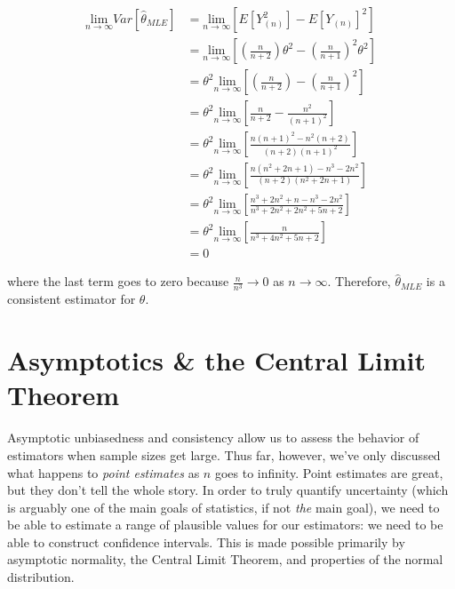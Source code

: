 \documentclass[
  letterpaper,
  DIV=11,
  numbers=noendperiod]{scrreprt}
\begin{document}
\begin{align*}
    \underset{n \to \infty}{\text{lim}} Var\left[\hat{\theta}_{MLE}\right] & = \underset{n \to \infty}{\text{lim}} \left[ E\left[Y_{(n)}^2\right] - E\left[Y_{(n)}\right]^2 \right]\\
    & = \underset{n \to \infty}{\text{lim}} \left[ \left( \frac{n}{n + 2} \right) \theta^2 - \left( \frac{n}{n + 1} \right)^2 \theta^2 \right] \\
    & = \theta^2 \underset{n \to \infty}{\text{lim}} \left[ \left( \frac{n}{n + 2} \right)  - \left( \frac{n}{n + 1} \right)^2\right] \\
    & = \theta^2 \underset{n \to \infty}{\text{lim}} \left[  \frac{n}{n + 2}   - \frac{n^2}{(n + 1)^2} \right] \\
    & = \theta^2 \underset{n \to \infty}{\text{lim}} \left[  \frac{n(n + 1)^2 - n^2 (n + 2)}{(n + 2)(n + 1)^2} \right] \\
    & = \theta^2 \underset{n \to \infty}{\text{lim}} \left[  \frac{n(n^2 + 2n + 1) - n^3 -2n^2}{(n + 2)(n^2 + 2n + 1)} \right] \\
    & = \theta^2 \underset{n \to \infty}{\text{lim}} \left[  \frac{n^3 + 2n^2 + n - n^3 -2n^2}{n^3 + 2n^2 + 2n^2 + 5n + 2} \right] \\
    & = \theta^2 \underset{n \to \infty}{\text{lim}} \left[  \frac{n}{n^3 + 4n^2  + 5n + 2} \right] \\
    & = 0
\end{align*}

where the last term goes to zero because \(\frac{n}{n^3} \to 0\) as
\(n \to \infty\). Therefore, \(\hat{\theta}_{MLE}\) is a consistent
estimator for \(\theta\).


\chapter{Asymptotics \& the Central Limit
Theorem}\label{asymptotics-the-central-limit-theorem}

Asymptotic unbiasedness and consistency allow us to assess the behavior
of estimators when sample sizes get large. Thus far, however, we've only
discussed what happens to \emph{point estimates} as \(n\) goes to
infinity. Point estimates are great, but they don't tell the whole
story. In order to truly quantify uncertainty (which is arguably one of
the main goals of statistics, if not \emph{the} main goal), we need to
be able to estimate a range of plausible values for our estimators: we
need to be able to construct confidence intervals. This is made possible
primarily by asymptotic normality, the Central Limit Theorem, and
properties of the normal distribution.
\end{document}
